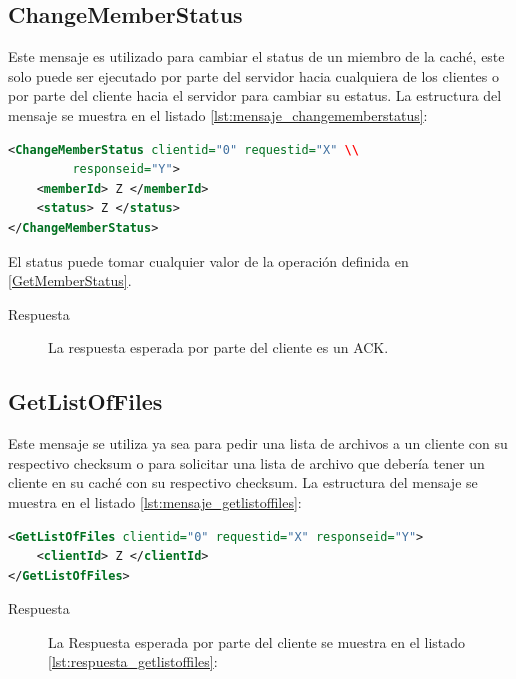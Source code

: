 \subsection{ChangeMemberStatus}
Este mensaje es utilizado para cambiar el status de un miembro de la caché, este solo puede ser ejecutado por parte del servidor hacia cualquiera de los clientes o  por parte del cliente hacia el servidor para cambiar su estatus. La estructura del mensaje se muestra en el listado \ref{lst:mensaje_changememberstatus}:

\begin{lstlisting}[language=XML,caption={Mensaje de ChangeMemberStatus},label={lst:mensaje_changememberstatus}]
<ChangeMemberStatus clientid="0" requestid="X" \\
		 responseid="Y"> 
	<memberId> Z </memberId>
	<status> Z </status>
</ChangeMemberStatus>
\end{lstlisting}


El status puede tomar cualquier valor de la operación definida en \ref{GetMemberStatus}. 


\begin{description}
\item[Respuesta] La respuesta esperada por parte del cliente es un ACK.
\end{description}

\subsection{GetListOfFiles}

Este mensaje se utiliza ya sea para pedir una lista de archivos a un cliente con su respectivo checksum o para solicitar una lista de archivo que debería tener un cliente en su caché con su respectivo checksum. La estructura del mensaje se muestra en el listado \ref{lst:mensaje_getlistoffiles}:

\begin{lstlisting}[language=XML,caption={Mensaje de GetListOfFiles},label={lst:mensaje_getlistoffiles}]
<GetListOfFiles clientid="0" requestid="X" responseid="Y"> 
	<clientId> Z </clientId>
</GetListOfFiles>
\end{lstlisting}

\begin{description}
\item[Respuesta] La Respuesta esperada por parte del cliente se muestra en el listado \ref{lst:respuesta_getlistoffiles}:
\end{description}

